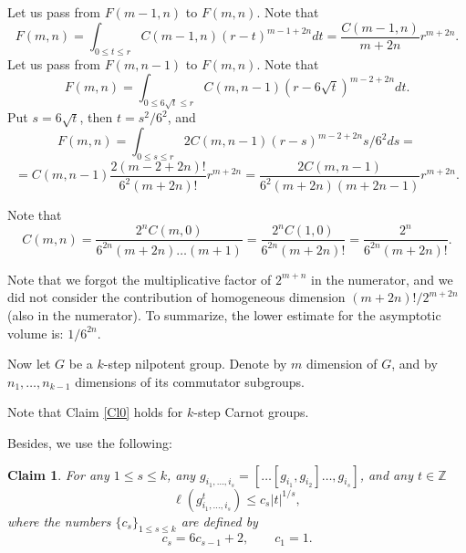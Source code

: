 \documentclass[11pt]{article}
\newcounter{razdel}[section]
\theoremstyle{Mystyle}
\newtheorem{Claim}[razdel]{Claim}
\begin{document}
Let us pass from $F(m-1,n)$ to $F(m,n)$. Note that
$$F(m,n) = \int_{0\leq t\leq r} C(m-1,n)(r-t)^{m-1+2n} dt = \frac{C(m-1,n)}{m+2n}r^{m+2n}.$$
Let us pass from $F(m,n-1)$ to $F(m,n)$. Note that
$$F(m,n) = \int_{0\leq 6\sqrt{t}\leq r} C(m,n-1)(r-6\sqrt{t})^{m-2+2n}dt.$$
Put $s = 6\sqrt{t}$, then $t=s^2/6^2$, and
$$F(m,n) = \int_{0\leq s\leq r}2C(m,n-1)(r-s)^{m-2+2n}s/6^2 ds=$$ 
$$=C(m,n-1)\frac{2(m-2+2n)!}{6^2(m+2n)!}r^{m+2n} = \frac{2C(m,n-1)}{6^2(m+2n)(m+2n-1)} r^{m+2n}.$$

Note that 
\begin{equation}
\label{2stepres}
C(m,n) =\frac{2^n C(m,0)}{6^{2n}(m+2n)\ldots (m+1)}  =  \frac{2^n C(1,0)}{6^{2n}(m+2n)!} = \frac{2^n}{6^{2n}(m+2n)!}.
\end{equation}

Note that we forgot the multiplicative factor of $2^{m+n}$ in the numerator, and we did not consider the contribution of homogeneous dimension $(m+2n)!/2^{m+2n}$ (also in the numerator). %
To summarize, the lower estimate for the asymptotic volume is:
$1/6^{2n}$.


Now let $G$ be a $k$-step nilpotent group. 
Denote by $m$ dimension of $G$, and by $n_1,\ldots, n_{k-1}$ dimensions of its commutator subgroups. 

Note that Claim \ref{Cl0} holds for $k$-step Carnot groups.


Besides, we use the following:

\begin{Claim}
\label{Cl2}
For any $1\leq s\leq k$, any $g_{i_{1},\ldots, i_{s}}=[\ldots[g_{i_1},g_{i_2}]\ldots, g_{i_s}]$, and any $t\in\mathbb{Z}$
$$\ell(g_{i_1,\ldots, i_{s}}^{t})\leq c_{s}|t|^{1/s},$$
where the numbers $\{c_{s}\}_{1\leq s\leq k}$ are defined by
\begin{equation}
\label{cdef}
c_{s}=6c_{s-1} + 2,\qquad c_{1}=1.
\end{equation}
\end{Claim}
\end{document}

